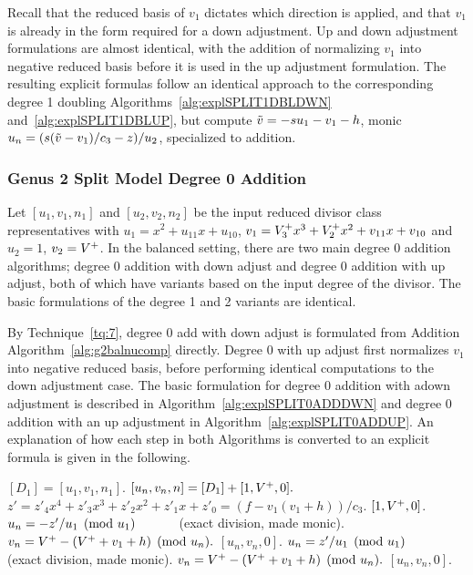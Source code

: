 Recall that the reduced basis of $v_1$ dictates which direction is applied, and
that $v_1$ is already in the form required for a down adjustment. Up and down
adjustment formulations are almost identical, with the addition of normalizing
$v_1$ into negative reduced basis before it is used in the up adjustment
formulation. The resulting explicit formulas follow an identical approach to
the corresponding degree 1 doubling Algorithms~\ref{alg:explSPLIT1DBLDWN}
and~\ref{alg:explSPLIT1DBLUP}, but compute $\tilde{v} = -su_1 - v_1 - h$, monic $u_n =
(s(\tilde{v} - v_1)/c_3 - z)/u_2$, specialized to addition. 


\subsubsection{Genus 2 Split Model Degree 0 Addition}\label{sec:degree0split}
Let $[u_1,v_1,n_1]$ and $[u_2,v_2,n_2]$ be the input reduced divisor class
representatives with $u_1 = x^2 + u_{11}x + u_{10}$, $v_1 = V^{+}_3x^3 + V^{+}_2x^2
+ v_{11}x + v_{10}$ and $u_2 = 1$, $v_2 = V^{+}$. In the balanced setting, there
are two main degree 0 addition algorithms; degree 0 addition with down adjust
and degree 0 addition with up adjust, both of which have variants based on the
input degree of the divisor. The basic formulations of the degree 1 and 2
variants are identical. 

By Technique~\ref{tq:7}, degree 0 add with down adjust is formulated from
Addition Algorithm~\ref{alg:g2balnucomp} directly. Degree 0 with up adjust
first normalizes $v_1$ into negative reduced basis, before performing identical
computations to the down adjustment case. The basic formulation for degree 0
addition with adown adjustment is described in
Algorithm~\ref{alg:explSPLIT0ADDDWN} and degree 0 addition with an up adjustment
in Algorithm~\ref{alg:explSPLIT0ADDUP}. An explanation of how each step in both
Algorithms is converted to an explicit formula is given in the following.

\begin{algorithm}[htbp]
\caption{Genus 2 Split Model Degree 0 Add with Down Adjust\label{alg:explSPLIT0ADDDWN}}
\begin{algorithmic} [1]
\Require $[D_1] = [u_1, v_1, n_1]$. \smallskip
\Ensure $[u_n,v_n,n] = [D_1] + [1,V^{+},0].$
\algrule
\State $z' = z'_4x^4 + z'_3x^3 + z'_2x^2 + z'_1x + z'_0 = (f - v_1(v_1 + h))/c_3$.
     \Return $[1, V^{+},0]$.
    \Else \hspace{4pt}
        \State $u_n = -z'/u_1 \pmod{u_1} \quad\quad\quad$ (exact division, made monic).
        \State $v_n =  V^{+} - (V^{+} + v_1 + h) \pmod{u_n}.$
        \State \Return $[u_n,v_n,0]$.
    \EndIf
\EndIf
\State $u_n = z'/u_1 \pmod{u_1} \quad\quad\quad$ (exact division, made monic).
\State $v_n =  V^{+} - (V^{+} + v_1 + h) \pmod{u_n}.$
\State \Return $[u_n,v_n,0]$.
\end{algorithmic}
\end{algorithm}

